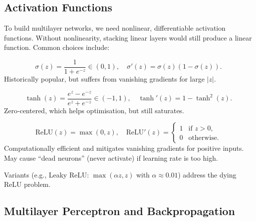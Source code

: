 \documentclass{tufte-handout}
\begin{document}
\subsection{Activation Functions}

To build multilayer networks, we need nonlinear, differentiable activation functions. Without nonlinearity, stacking linear layers would still produce a linear function. Common choices include:

\begin{defn}[Sigmoid]
    \[
    \sigma(z) = \frac{1}{1+e^{-z}} \in (0,1),\quad \sigma'(z) = \sigma(z)(1-\sigma(z)).
    \]
    Historically popular, but suffers from vanishing gradients for large $|z|$.
\end{defn}
\begin{defn}
    \[
    \tanh(z) = \frac{e^{z}-e^{-z}}{e^{z}+e^{-z}} \in (-1,1),\quad \tanh'(z) = 1-\tanh^2(z).
    \]
    Zero‑centered, which helps optimisation, but still saturates.
\end{defn}
\begin{defn}
    \[
    \text{ReLU}(z) = \max(0,z),\quad \text{ReLU}'(z) = \begin{cases} 1 & \text{if } z>0,\\ 0 & \text{otherwise.} \end{cases}
    \]
    Computationally efficient and mitigates vanishing gradients for positive inputs. May cause “dead neurons” (never activate) if learning rate is too high.
\end{defn}
\begin{defn}
    Variants (e.g., Leaky ReLU: $\max(\alpha z, z)$ with $\alpha \approx 0.01$) address the dying ReLU problem.
\end{defn}

\begin{marginfigure}
\centering
{}
\caption{The sigmoid activation squashes inputs to $(0,1)$ and is differentiable.}
\end{marginfigure}

\subsection{Multilayer Perceptron and Backpropagation}
\end{document}
